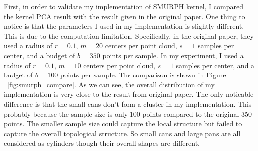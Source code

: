 \documentclass[10pt]{article}
\begin{document}
First, in order to validate my implementation of SMURPH kernel, I compared the kernel PCA result
with the result given in the original paper. 
One thing to notice is that the parameters I used in my implementation is slightly different.
This is due to the computation limitation.
Specifically, in the original paper, they used a radius of $r = 0.1$, $m = 20$ centers per point cloud, $s = 1$ samples per center, and a budget of $b = 350$ points per sample.
In my experiment, I used a radius of $r = 0.1$, $m = 10$ centers per point cloud, $s = 1$ samples per center, and a budget of $b = 100$ points per sample.
The comparison is shown in Figure ~\ref{fig:smurph_compare}.
As we can see, the overall distribution of my implementation is very close to the result from original paper.
The only noticable difference is that the small cans don't form a cluster in my implementation.
This probably because the sample size is only 100 points compared to the original 350 points.
The smaller sample size could capture the local structure but failed to capture the overall topological structure.
So small cans and large pans are all considered as cylinders though their overall shapes are different.
\end{document}
